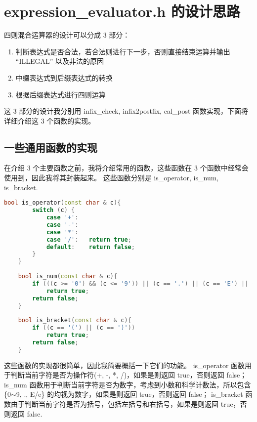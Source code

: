\documentclass[UTF8]{ctexart}
\begin{document}
\pagestyle{fancy}
\fancyhead{}

\section{expression\_evaluator.h 的设计思路}
四则混合运算器的设计可以分成 3 部分：
\begin{enumerate}[(1)]
    \item 判断表达式是否合法，若合法则进行下一步，否则直接结束运算并输出 “ILLEGAL” 以及非法的原因
    \item 中缀表达式到后缀表达式的转换
    \item 根据后缀表达式进行四则运算
\end{enumerate}

这 3 部分的设计我分别用 infix\_check, infix2postfix, cal\_post 函数实现，下面将详细介绍这 3 个函数的实现。

\subsection{一些通用函数的实现}
在介绍 3 个主要函数之前，我将介绍常用的函数，这些函数在 3 个函数中经常会使用到，因此我将其封装起来。
这些函数分别是 is\_operator, is\_num, is\_bracket. 
\begin{lstlisting}[language=c++, breaklines=true, keywordstyle=\color{blue!70}, commentstyle=\color{red!50!green!50!blue!50}, frame=shadowbox, rulesepcolor=\color{red!20!green!20!blue!20}]
    bool is_operator(const char & c){
        switch (c) {
            case '+':
            case '-':
            case '*':
            case '/':   return true; 
            default:    return false; 
        }
    }
    
    bool is_num(const char & c){
        if (((c >= '0') && (c <= '9')) || (c == '.') || (c == 'E') || (c == 'e'))
            return true; 
        return false; 
    }
    
    bool is_bracket(const char & c){
        if ((c == '(') || (c == ')'))
            return true; 
        return false;
    }
\end{lstlisting}

这些函数的实现都很简单，因此我简要概括一下它们的功能。
is\_operator 函数用于判断当前字符是否为操作符(+, -, *, /)，如果是则返回 true，否则返回 false；
is\_num 函数用于判断当前字符是否为数字，考虑到小数和科学计数法，所以包含 \{0$\sim$9, ., E/e\} 的均视为数字，如果是则返回 true，否则返回 false；
is\_bracket 函数由于判断当前字符是否为括号，包括左括号和右括号，如果是则返回 true，否则返回 false. 
\end{document}
